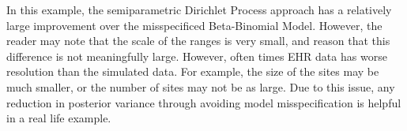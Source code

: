 \documentclass{article}
\begin{document}
In this example, the semiparametric Dirichlet Process approach has a relatively large improvement over the misspecificed Beta-Binomial Model. However, the reader may note that the scale of the ranges is very small, and reason that this difference is not meaningfully large. However, often times EHR data has worse resolution than the simulated data. For example, the size of the sites may be much smaller, or the number of sites may not be as large. Due  to this issue, any reduction in posterior variance through avoiding model misspecification is helpful in a real life example.


\end{document}

